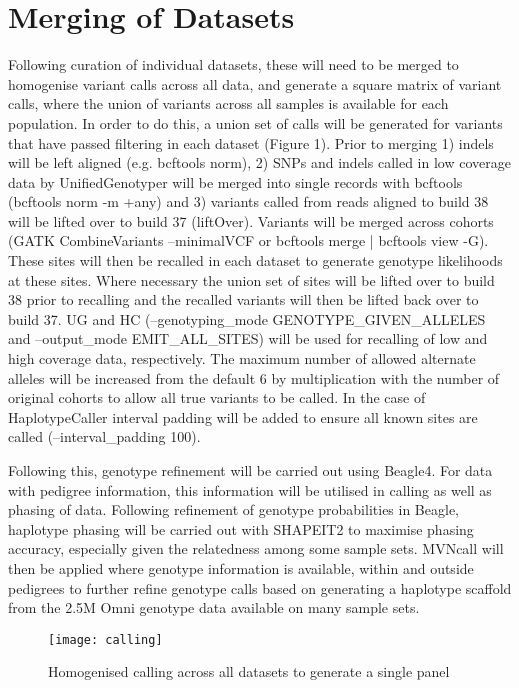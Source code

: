 \section{Merging of Datasets}

Following curation of individual datasets, these will need to be merged to homogenise variant calls across all data, and generate a square matrix of variant calls, where the union of variants across all samples is available for each population. In order to do this, a union set of calls will be generated for variants that have passed filtering in each dataset (Figure 1). Prior to merging 1) indels will be left aligned (e.g. bcftools norm), 2) SNPs and indels called in low coverage data by UnifiedGenotyper will be merged into single records with bcftools (bcftools norm -m +any) and 3) variants called from reads aligned to build 38 will be lifted over to build 37 (liftOver). %
Variants will be merged across cohorts (GATK CombineVariants --minimalVCF or bcftools merge | bcftools view -G). These sites will then be recalled in each dataset to generate genotype likelihoods at these sites. Where necessary the union set of sites will be lifted over to build 38 prior to recalling and the recalled variants will then be lifted back over to build 37. UG and HC (--genotyping\_mode GENOTYPE\_GIVEN\_ALLELES and --output\_mode EMIT\_ALL\_SITES) will be used for recalling of low and high coverage data, respectively. The maximum number of allowed alternate alleles will be increased from the default 6 by multiplication with the number of original cohorts to allow all true variants to be called. In the case of HaplotypeCaller interval padding will be added to ensure all known sites are called (--interval_padding 100).

Following this, genotype refinement will be carried out using Beagle4. For data with pedigree information, this information will be utilised in calling as well as phasing of data. Following refinement of genotype probabilities in Beagle, haplotype phasing will be carried out with SHAPEIT2 to maximise phasing accuracy, especially given the relatedness among some sample sets. MVNcall\cite{Menelaou2013} will then be applied where genotype information is available, within and outside pedigrees to further refine genotype calls based on generating a haplotype scaffold from the 2.5M Omni genotype data available on many sample sets.

\begin{figure}[h]
\caption{Homogenised calling across all datasets to generate a single panel}
\centering
\texttt{[image: calling]}
\end{figure}
